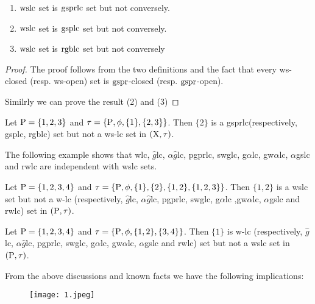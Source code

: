 \begin{thm}\label{thm7.2.8}
\begin{enumerate}[(1)]
\item $\mathrm{wslc}$ set is $\mathrm{gsprlc}$ set but not conversely.
\item $\mathrm{wslc}$ set is $\mathrm{gsplc}$ set but not conversely.
\item $\mathrm{wslc}$ set is $\mathrm{rgblc}$ set but not conversely
\end{enumerate}
\end{thm}

\begin{proof}
The proof follows from the two definitions and the fact that every ws-closed (resp. ws-open) set is $\mathrm{gspr}$-closed (resp. $\mathrm{gspr}$-open).

Similrly we can prove the result (2) and (3)
\end{proof}

\begin{exm}\label{exam7.2.9}
Let $\mathrm{P}= \{1,2, 3\}$ and $\tau=\{\mathrm{P}, \phi, \{1\}, \{2,3\}\}$. Then $\{2\}$ is a gsprlc(respectively, gsplc, rgblc) set but not a ws-lc set in $(\mathrm{X}, \tau)$.
\end{exm}

\begin{rem}\label{rem7.2.2}
The following example shows that wlc, $\hat{g}$lc, $\alpha\hat{g}$lc, pgprlc, swglc, g$\alpha$lc, gw$\alpha$lc, $\alpha$gslc and rwlc are independent with wslc sets.
\end{rem}

\begin{exm}\label{exam7.2.10}
Let $\mathrm{P}= \{1, 2, 3, 4\}$ and $\tau=\{\mathrm{P}, \phi, \{1\}, \{2\}, \{1, 2\}, \{1, 2, 3\}\}$. Then $\{1, 2\}$ is a wslc set but not a w-lc (respectively, $\hat{g}$lc, $\alpha\hat{g}$lc, pgprlc, swglc, g$\alpha$lc ,gw$\alpha$lc, $\alpha$gslc and rwlc) set in $(\mathrm{P}, \tau)$.
\end{exm}

\begin{exm}\label{exam7.2.11}
Let $\mathrm{P}= \{1,2,3, 4\}$ and $\tau=\{\mathrm{P}, \phi, \{1, 2\}, \{3,4\}\}$. Then $\{1\}$ is w-lc (respectively, $\hat{g}$lc, $\alpha\hat{g}$lc, pgprlc, swglc, g$\alpha$lc, gw$\alpha$lc, $\alpha$gslc and rwlc) set but not a wslc set in $(\mathrm{P}, \tau)$.
\end{exm}

\begin{rem}\label{rem7.2.3}
From the above discussions and known facts we have the following implications:
\begin{figure}[H]
\centering
\texttt{[image: 1.jpeg]}
\end{figure}
\end{rem}

